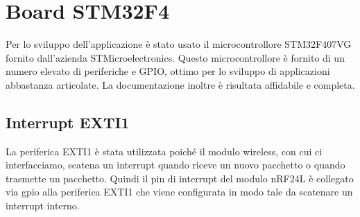 \section{Board STM32F4}
Per lo sviluppo dell'applicazione è stato usato il microcontrollore STM32F407VG\cite{manual-stm32f4} fornito dall'azienda STMicroelectronics\cite{stm}. Questo microcontrollore è fornito di un numero elevato di periferiche e GPIO, ottimo per lo sviluppo di applicazioni abbastanza articolate. La documentazione inoltre è risultata affidabile e completa.\par

\subsection{Interrupt EXTI1}
La periferica EXTI1 è stata utilizzata poiché il modulo wireless, con cui ci interfacciamo, scatena un interrupt quando riceve un nuovo pacchetto o quando trasmette un pacchetto. Quindi il pin di interrupt del modulo nRF24L è collegato via gpio alla periferica EXTI1 che viene configurata in modo tale da scatenare un interrupt interno.

